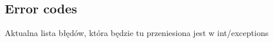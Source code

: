 \subsection{Error codes}

Aktualna lista błędów, która będzie tu przeniesiona jest w int/exceptions

